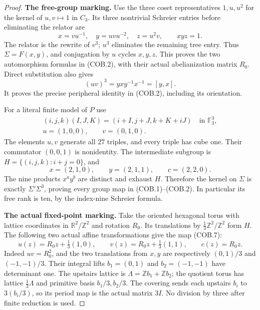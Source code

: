 \begin{proof}
\par\medskip\noindent\textbf{The free-group marking.}\quad
Use the three coset representatives $1,u,u^2$ for the
kernel of $u,v\mapsto1$ in $C_3$. Its three nontrivial
Schreier entries before eliminating the relator are
\[
 x=vu^{-1},\quad y=uvu^{-2},\quad z=u^2v,
                 \qquad xyz=1.
                                                               \tag{COB.5}
\]
The relator is the rewrite of $v^3$; $u^3$ eliminates
the remaining tree entry. Thus $\Sigma=F(x,y)$,
and conjugation by $u$ cycles $x,y,z$. This proves
the two automorphism formulas in (COB.2), with their
actual abelianization matrix $R_0$. Direct substitution
also gives
\[
                  (uv)^3=yxy^{-1}x^{-1}=[y,x].
                                                               \tag{COB.6}
\]
It proves the precise peripheral identity in (COB.2),
including its orientation.

For a literal finite model of $P$ use
\[
 \begin{gathered}
 (i,j,k)(I,J,K)=(i+I,j+J,k+K+iJ)\quad\text{in }\mathbb F_3^3,\\
 u=(1,0,0),\qquad v=(0,1,0).
 \end{gathered}
                                                               \tag{COB.7}
\]
The elements $u,v$ generate all $27$ triples, and every
triple has cube one. Their commutator $(0,0,1)$ is
nonidentity. The intermediate subgroup is
$H=\{(i,j,k):i+j=0\}$, and
\[
 x=(2,1,0),\qquad y=(2,1,1),\qquad c=(2,2,0).
                                                               \tag{COB.8}
\]
The nine products $x^a y^b$ are distinct and exhaust
$H$. Therefore the kernel on $\Sigma$ is exactly
$\Sigma'\Sigma^3$, proving every group map in
(COB.1)--(COB.2). In particular its free rank is ten,
by the index-nine Schreier formula.

\par\medskip\noindent\textbf{The actual fixed-point marking.}\quad
Take the oriented hexagonal torus with lattice
coordinates in $\mathbb R^2/\mathbb Z^2$ and rotation
$R_0$. Its translations by $\frac13\mathbb Z^2/
\mathbb Z^2$ form $H$. The following two actual
affine transformations give the map (COB.7):
\[
 u(z)=R_0z+\tfrac13(1,0),\qquad
 v(z)=R_0z+\tfrac13(1,1),\qquad c(z)=R_0z.
                                                               \tag{COB.9}
\]
Indeed $uv=R_0^2$, and the two translations from
$x,y$ are respectively $(0,1)/3$ and $(-1,-1)/3$.
Their integral lifts $b_1=(0,1)$ and $b_2=(-1,-1)$
have determinant one. The upstairs lattice is
$\Lambda=\mathbb Zb_1+\mathbb Zb_2$; the quotient
torus has lattice $\frac13\Lambda$ and primitive
basis $b_1/3,b_2/3$. The covering sends each upstairs
$b_i$ to $3(b_i/3)$, so its period map is the actual
matrix $3I$. No division by three after finite
reduction is used.


\end{proof}
